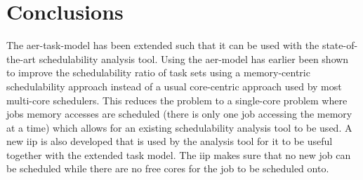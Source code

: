 \documentclass{kththesis}
\begin{document}











\section{Conclusions}

The \acrshort{aer}-task-model has been extended such that it can be used with the state-of-the-art
schedulability analysis tool. Using the \acrshort{aer}-model has earlier been shown to improve the
schedulability ratio of task sets using a memory-centric schedulability approach instead of a usual
core-centric approach used by most multi-core schedulers. This reduces the problem to a single-core
problem where jobs memory accesses are scheduled (there is only one job accessing the memory at a
time) which allows for an existing schedulability analysis tool to be used. A new \acrshort{iip} is
also developed that is used by the analysis tool for it to be useful together with the extended
task model. The \acrshort{iip} makes sure that no new job can be scheduled while there are no free
cores for the job to be scheduled onto. 
\end{document}
